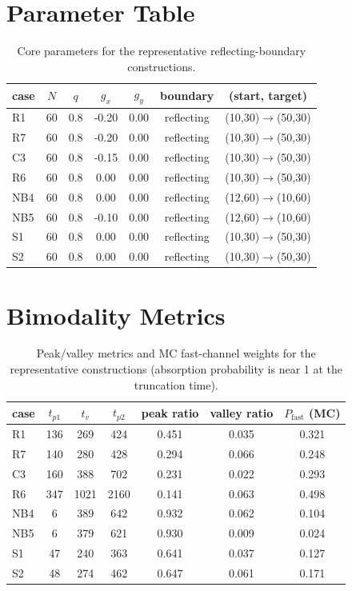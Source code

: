 \documentclass[11pt]{article}
\begin{document}
\section*{Parameter Table}
\begin{table}[!htbp]
  \centering
  \begin{tabular}{lcccccc}
    \toprule
    case & $N$ & $q$ & $g_x$ & $g_y$ & boundary & (start, target) \\
    \midrule
    R1 & 60 & 0.8 & -0.20 & 0.00 & reflecting & (10,30)$\to$(50,30) \\
    R7 & 60 & 0.8 & -0.20 & 0.00 & reflecting & (10,30)$\to$(50,30) \\
    C3 & 60 & 0.8 & -0.15 & 0.00 & reflecting & (10,30)$\to$(50,30) \\
    R6 & 60 & 0.8 & 0.00 & 0.00 & reflecting & (10,30)$\to$(50,30) \\
    NB4 & 60 & 0.8 & 0.00 & 0.00 & reflecting & (12,60)$\to$(10,60) \\
    NB5 & 60 & 0.8 & -0.10 & 0.00 & reflecting & (12,60)$\to$(10,60) \\
    S1 & 60 & 0.8 & 0.00 & 0.00 & reflecting & (10,30)$\to$(50,30) \\
    S2 & 60 & 0.8 & 0.00 & 0.00 & reflecting & (10,30)$\to$(50,30) \\
    \bottomrule
  \end{tabular}
  \caption{Core parameters for the representative reflecting-boundary constructions.}
  \label{tab:params}
\end{table}

\section*{Bimodality Metrics}
\begin{table}[!htbp]
  \centering
  \footnotesize
  \begin{tabular}{lcccccc}
    \toprule
    case & $t_{p1}$ & $t_v$ & $t_{p2}$ & peak ratio & valley ratio & $P_{\text{fast}}$ (MC) \\
    \midrule
    R1 & 136 & 269 & 424 & 0.451 & 0.035 & 0.321 \\
    R7 & 140 & 280 & 428 & 0.294 & 0.066 & 0.248 \\
    C3 & 160 & 388 & 702 & 0.231 & 0.022 & 0.293 \\
    R6 & 347 & 1021 & 2160 & 0.141 & 0.063 & 0.498 \\
    NB4 & 6 & 389 & 642 & 0.932 & 0.062 & 0.104 \\
    NB5 & 6 & 379 & 621 & 0.930 & 0.009 & 0.024 \\
    S1 & 47 & 240 & 363 & 0.641 & 0.037 & 0.127 \\
    S2 & 48 & 274 & 462 & 0.647 & 0.061 & 0.171 \\
    \bottomrule
  \end{tabular}
  \caption{Peak/valley metrics and MC fast-channel weights for the representative constructions (absorption probability is near 1 at the truncation time).}
  \label{tab:metrics}
\end{table}
\end{document}
